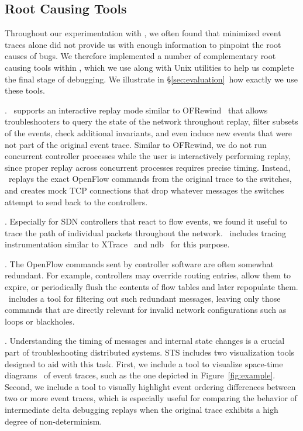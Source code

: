 \subsection{Root Causing Tools}
\label{subsec:root_causing}

Throughout our experimentation with \projectname, we often found that
minimized event traces alone did not provide us with enough information to
pinpoint the root causes of bugs. We therefore implemented a number of
complementary root
causing tools within \projectname,
which we use along with Unix utilities to help us complete the final
stage of debugging. We illustrate in \S\ref{sec:evaluation}~how exactly we use
these tools.

. \projectname~supports an interactive replay mode
similar to OFRewind~\cite{ofrewind} that allows troubleshooters to query the
state of the network throughout replay, filter subsets of the events, check
additional invariants, and
even induce new events that were not part of the original event trace.
Similar to OFRewind, we do not run concurrent controller processes while the
user is interactively performing replay, since proper replay across
concurrent processes requires precise timing.
Instead, \projectname~replays the exact OpenFlow commands from the
original trace to the switches, and creates mock TCP connections that drop
whatever messages the switches attempt to send back to the controllers.

. Especially for SDN controllers that react to
flow events, we found it useful to trace the path of individual
packets throughout the network. \projectname~includes tracing instrumentation
similar
to XTrace~\cite{fonseca2007x} and ndb~\cite{handigol2012debugger} for this
purpose.

. The OpenFlow commands sent by controller software
are often somewhat redundant. For example, controllers may override routing
entries, allow them to expire, or periodically flush the
contents of flow tables and later repopulate them. \projectname~includes a
tool for filtering out such redundant messages,
leaving only those commands that are directly relevant for invalid network
configurations such as loops or blackholes.

. Understanding the timing of messages and internal
state changes is a crucial part of troubleshooting distributed systems.
STS includes two visualization tools designed to aid with this task. First, we
include a tool to visualize space-time diagrams~\cite{Lamport:1978:TCO:359545.359563}
of event traces, such as the one depicted in Figure~\ref{fig:example}.
Second, we include a tool to visually highlight event ordering differences
between two or more event traces, which is especially useful for comparing the behavior of
intermediate delta debugging replays when the original trace exhibits a high degree of non-determinism.

